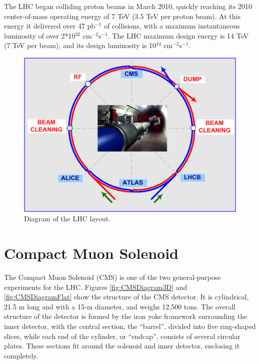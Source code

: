 The LHC began colliding proton beams in March 2010, 
quickly reaching its 2010 center-of-mass operating energy of 7 TeV
(3.5 TeV per proton beam).  
At this energy it delivered over 47 pb$^{-1}$ of collisions, 
with a maximum instantaneous luminosity of over 2*10$^{32}$ cm$^{-2}$s$^{-1}$.  
The LHC maximum design energy is 14 TeV (7 TeV per beam), 
and its design luminosity is 10$^{34}$ cm$^{-2}$s$^{-1}$.  

 \begin{figure}[htb]
  \begin{center}
    \includegraphics[width=360pt]{Figures/lhc-schematic-ml.png} 
  \end{center}
  \caption[\fixspacing Diagram of the LHC layout]
	  {\fixspacing Diagram of the LHC layout.}
  \label{fig:LHCDiagram}
 \end{figure}


\section{Compact Muon Solenoid}
\label{exp:CMS}


The Compact Muon Solenoid (CMS) \cite{CmsExperimentAtCernLHC}
is one of the two general-purpose experiments for the LHC.  
Figures \ref{fig:CMSDiagram3D} and \ref{fig:CMSDiagramFlat} 
show the structure of the CMS detector.  
It is cylindrical, 21.5 m long and with a 15-m diameter, and weighs 12,500 tons.  
The overall structure of the detector is formed by the iron yoke framework surrounding the inner detector,
with the central section, the ``barrel'', divided into five ring-shaped slices, 
while each end of the cylinder, or ``endcap'', consists of several circular plates.  
These sections fit around the solenoid and inner detector, enclosing it completely.  

